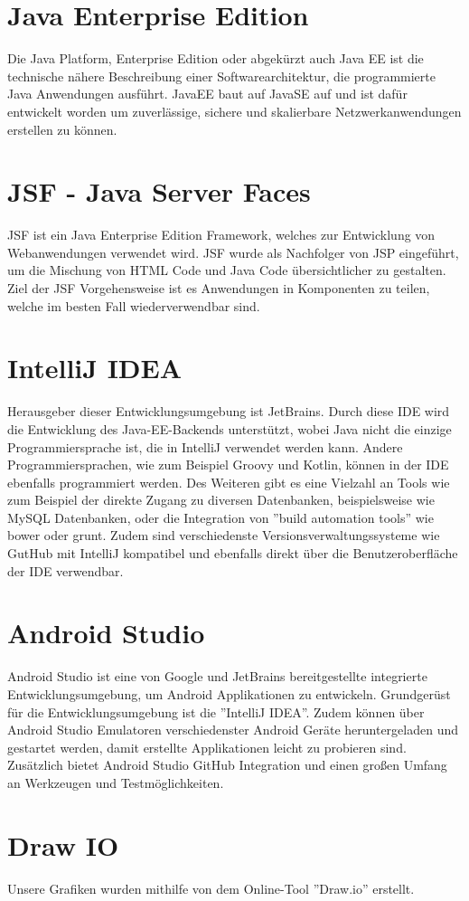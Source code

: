 \section{Java Enterprise Edition}\label{sec:javaee}
Die Java Platform, Enterprise Edition oder abgekürzt auch Java EE ist die technische nähere Beschreibung einer Softwarearchitektur, die programmierte Java Anwendungen ausführt. JavaEE baut auf JavaSE auf und ist dafür entwickelt worden um zuverlässige, sichere und skalierbare Netzwerkanwendungen erstellen zu können. \cite{differenceeese}\cite{wikijavaee}

\section{JSF - Java Server Faces}\label{sec:javaee}
JSF ist ein Java Enterprise Edition Framework, welches zur Entwicklung von Webanwendungen verwendet wird. JSF wurde als Nachfolger von JSP eingeführt, um die Mischung von HTML Code und Java Code übersichtlicher zu gestalten. Ziel der JSF Vorgehensweise ist es Anwendungen in Komponenten zu teilen, welche im besten Fall wiederverwendbar sind. \cite{wikijsf}

\section{IntelliJ IDEA}
Herausgeber dieser Entwicklungsumgebung ist JetBrains. Durch diese IDE wird die Entwicklung des Java-EE-Backends unterstützt, wobei Java nicht die einzige Programmiersprache ist, die in IntelliJ verwendet werden kann. Andere Programmiersprachen, wie zum Beispiel Groovy und Kotlin, können in der IDE ebenfalls programmiert werden. Des Weiteren gibt es eine Vielzahl an Tools wie zum Beispiel der direkte Zugang zu diversen Datenbanken, beispielsweise wie MySQL Datenbanken, oder die Integration von ''build automation tools'' wie bower oder grunt. Zudem sind verschiedenste Versionsverwaltungssysteme wie GutHub mit IntelliJ kompatibel und ebenfalls direkt über die Benutzeroberfläche der IDE verwendbar.\cite{wikiintelij}

\section{Android Studio}
Android Studio ist eine von Google und JetBrains bereitgestellte integrierte Entwicklungsumgebung, um Android Applikationen zu entwickeln. Grundgerüst für die Entwicklungsumgebung ist die ''IntelliJ IDEA''. Zudem können über Android Studio Emulatoren verschiedenster Android Geräte heruntergeladen und gestartet werden, damit erstellte Applikationen leicht zu probieren sind. Zusätzlich bietet Android Studio GitHub Integration und einen großen Umfang an Werkzeugen und Testmöglichkeiten.
\cite{androidstudio}

\section{Draw IO}
Unsere Grafiken wurden mithilfe von dem Online-Tool ''Draw.io'' erstellt. \cite{drawio}

  